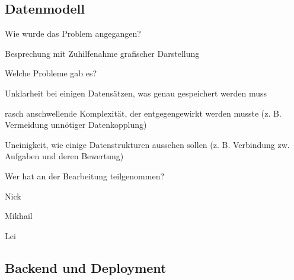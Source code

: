 \documentclass{article}
\begin{document}
\subsection{Datenmodell}
\begin{description}[font=$\bullet$]
  \item Wie wurde das Problem angegangen?
        \begin{description}[font=$\bullet$]
          \item Besprechung mit Zuhilfenahme grafischer Darstellung
        \end{description}

  \item Welche Probleme gab es?

        \begin{description}[font=$\bullet$]
          \item Unklarheit bei einigen Datensätzen, was genau gespeichert werden muss
          \item rasch anschwellende Komplexität, der entgegengewirkt werden musste (z. B. Vermeidung unnötiger Datenkopplung)
          \item Uneinigkeit, wie einige Datenstrukturen aussehen sollen (z. B. Verbindung zw. Aufgaben und deren Bewertung)
        \end{description}

  \item Wer hat an der Bearbeitung teilgenommen?

        \begin{description}[font=$\bullet$]
          \item Nick
          \item Mikhail
          \item Lei
        \end{description}
\end{description}


\subsection{Backend und Deployment}
\end{document}
